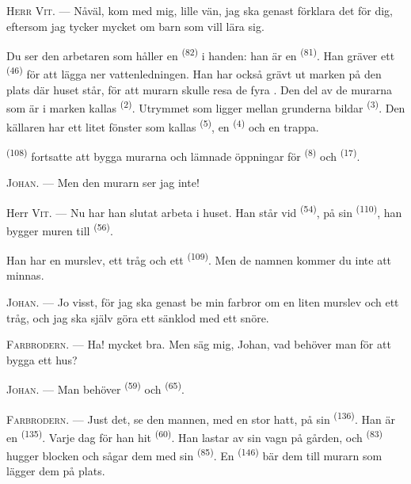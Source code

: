 \VUsaut{3.0mm}

\textsc{Herr Vit}. --- Nåväl, kom med mig, lille vän, jag ska genast förklara det för dig,
eftersom jag tycker mycket om barn som vill lära sig.

Du ser den arbetaren som håller en  \textsuperscript{(82)} i handen: han är en
 \textsuperscript{(81)}. Han gräver ett
 \textsuperscript{(46)} för att lägga ner vattenledningen. Han har
också grävt ut marken på den plats där huset står, för att murarn skulle resa de fyra
. Den del av de murarna som är i marken kallas
 \textsuperscript{(2)}. Utrymmet som ligger mellan grunderna
bildar  \textsuperscript{(3)}. Den källaren har ett litet fönster som kallas
 \textsuperscript{(5)}, en
 \textsuperscript{(4)} och en trappa.

 \textsuperscript{(108)} fortsatte att bygga murarna och lämnade
öppningar för  \textsuperscript{(8)} och 
\textsuperscript{(17)}.

\textsc{Johan}. --- Men den murarn ser jag inte!

Herr \textsc{Vit}. --- Nu har han slutat arbeta i huset. Han står vid
 \textsuperscript{(54)}, på sin 
\textsuperscript{(110)}, han bygger muren till  \textsuperscript{(56)}.

Han har en murslev, ett tråg och ett  \textsuperscript{(109)}. Men de namnen
kommer du inte att minnas.

\textsc{Johan}. --- Jo visst, för jag ska genast be min farbror om en liten murslev och ett
tråg, och jag ska själv göra ett sänklod med ett snöre.

\VUsaut{3.0mm}
\VUsaut{3.0mm}

\textsc{Farbrodern}. --- Ha! mycket bra. Men säg mig, Johan, vad behöver man för att bygga ett
hus?

\textsc{Johan}. --- Man behöver  \textsuperscript{(59)} och
 \textsuperscript{(65)}.

\textsc{Farbrodern}. --- Just det, se den mannen, med en stor hatt, på sin
 \textsuperscript{(136)}. Han är en 
\textsuperscript{(135)}. Varje dag för han hit  \textsuperscript{(60)}. Han
lastar av sin vagn på gården, och
 \textsuperscript{(83)} hugger blocken och sågar dem med
sin  \textsuperscript{(85)}. En  \textsuperscript{(146)}
bär dem till murarn som lägger dem på plats.

